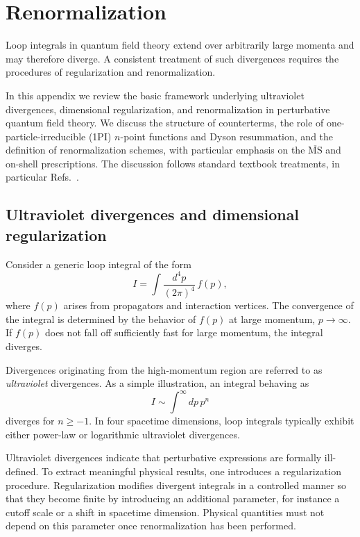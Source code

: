\chapter{Renormalization}
\label{app:renormalization}

Loop integrals in quantum field theory extend over arbitrarily large
momenta and may therefore diverge.
A consistent treatment of such divergences requires the procedures of
regularization and renormalization.

In this appendix we review the basic framework underlying ultraviolet
divergences, dimensional regularization, and renormalization in
perturbative quantum field theory.
We discuss the structure of counterterms, the role of
one-particle-irreducible (1PI) $n$-point functions and Dyson resummation,
and the definition of renormalization schemes, with particular
emphasis on the $\overline{\mathrm{MS}}$ and on-shell prescriptions.
The discussion follows standard textbook treatments,
in particular Refs.~\cite{PeskinSchroeder1995,WeinbergQFT}.

\section*{Ultraviolet divergences and dimensional regularization}

Consider a generic loop integral of the form
\begin{equation}
I = \int \frac{d^4 p}{(2\pi)^4} \, f(p),
\end{equation}
where $f(p)$ arises from propagators and interaction vertices.
The convergence of the integral is determined by the behavior of
$f(p)$ at large momentum, $p \to \infty$.
If $f(p)$ does not fall off sufficiently fast for large momentum, the integral diverges.

Divergences originating from the high-momentum region are referred to
as \emph{ultraviolet} divergences.
As a simple illustration, an integral behaving as
\begin{equation}
I \sim \int^{\infty} dp \, p^{n}
\end{equation}
diverges for $n \ge -1$.
In four spacetime dimensions, loop integrals typically exhibit either
power-law or logarithmic ultraviolet divergences.

Ultraviolet divergences indicate that perturbative expressions are
formally ill-defined.
To extract meaningful physical results, one introduces a
regularization procedure.
Regularization modifies divergent integrals in a controlled manner so
that they become finite by introducing an additional parameter, for instance
a cutoff scale or a shift in spacetime dimension.
Physical quantities must not depend on this parameter once
renormalization has been performed.

